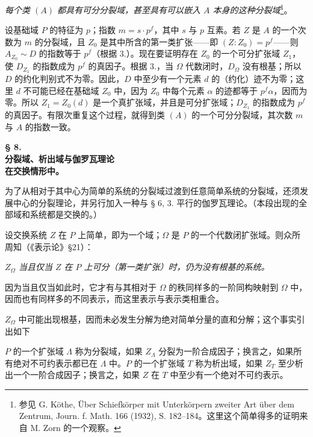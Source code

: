 \medskip
\noindent\textbf{}\quad \emph{每个类 \((A)\) 都具有可分分裂域，甚至具有可以嵌入 \(A\) 本身的这种分裂域}\footnote{参见 G. Köthe, Über Schiefkörper mit Unterkörpern zweiter Art über dem Zentrum, Journ. f. Math. 166 (1932), S. 182--184。这里这个简单得多的证明来自 M. Zorn 的一个观察。}。

设基础域 \(P\) 的特征为 \(p\)；指数 \(m=s\cdot p^f\)，其中 \(s\) 与 \(p\) 互素。若 \(Z\) 是 \(A\) 的一个次数为 \(m\) 的分裂域，且 \(Z_0\) 是其中所含的第一类扩张——即 \((Z:Z_0)=p^f\)——则 \(A_{Z_0}\sim D\) 的指数等于 \(p^f\)（根据 3.）。现在要证明存在 \(Z_0\) 的一个可分扩张域 \(Z_1\)，使 \(D_{Z_1}\) 的指数成为 \(p^f\) 的真因子。根据 3.，当 \(\Omega\) 代数闭时，\(D_\Omega\) 没有根基；所以 \(D\) 的约化判别式不为零。因此，\(D\) 中至少有一个元素 \(d\) 的（约化）迹不为零；这里 \(d\) 不可能已经在基础域 \(Z_0\) 中，因为 \(Z_0\) 中每个元素 \(\alpha\) 的迹都等于 \(p^f\alpha\)，因而为零。所以 \(Z_1=Z_0(d)\) 是一个真扩张域，并且是可分扩张域；\(D_{Z_1}\) 的指数成为 \(p^f\) 的真因子。有限次重复这个过程，就得到类 \((A)\) 的一个可分分裂域，其次数 \(m\) 与 \(A\) 的指数一致。

\begin{center}
\textbf{§ 8.}\\[0.35em]
\textbf{分裂域、析出域与伽罗瓦理论\\
在交换情形中。}
\end{center}

为了从相对于其中心为简单的系统的分裂域过渡到任意简单系统的分裂域，还须发展中心的分裂理论，并另行加入一种与 § 6, 3. 平行的伽罗瓦理论。（本段出现的全部域和系统都是交换的。）

\noindent\textbf{}\quad 设交换系统 \(Z\) 在 \(P\) 上简单，即为一个域；\(\Omega\) 是 \(P\) 的一个代数闭扩张域。则众所周知（《表示论》§21）：

\noindent\emph{\(Z_\Omega\) 当且仅当 \(Z\) 在 \(P\) 上可分（第一类扩张）时，仍为没有根基的系统。}

因为当且仅当如此时，它才有与其相对于 \(\Omega\) 的秩同样多的一阶同构映射到 \(\Omega\) 中，因而也有同样多的不同表示，而这里表示与表示类相重合。

\(Z_\Omega\) 中可能出现根基，因而未必发生分解为绝对简单分量的直和分解；这个事实引出如下

\noindent\textbf{}\quad \(P\) 的一个扩张域 \(\Lambda\) 称为分裂域，如果 \(Z_\Lambda\) 分裂为一阶合成因子；换言之，如果所有绝对不可约表示都已在 \(\Lambda\) 中。\(P\) 的一个扩张域 \(T\) 称为析出域，如果 \(Z_T\) 至少析出一个一阶合成因子；换言之，如果 \(Z\) 在 \(T\) 中至少有一个绝对不可约表示。

